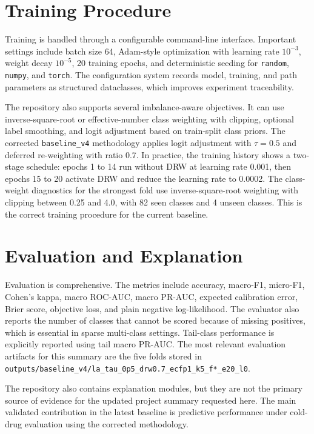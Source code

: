 \documentclass[12pt,a4paper]{report}
\begin{document}
\section*{Training Procedure}
Training is handled through a configurable command-line interface. Important settings include batch size 64, Adam-style optimization with learning rate \(10^{-3}\), weight decay \(10^{-5}\), 20 training epochs, and deterministic seeding for \texttt{random}, \texttt{numpy}, and \texttt{torch}. The configuration system records model, training, and path parameters as structured dataclasses, which improves experiment traceability.

The repository also supports several imbalance-aware objectives. It can use inverse-square-root or effective-number class weighting with clipping, optional label smoothing, and logit adjustment based on train-split class priors. The corrected \texttt{baseline\_v4} methodology applies logit adjustment with \(\tau = 0.5\) and deferred re-weighting with ratio 0.7. In practice, the training history shows a two-stage schedule: epochs 1 to 14 run without DRW at learning rate 0.001, then epochs 15 to 20 activate DRW and reduce the learning rate to 0.0002. The class-weight diagnostics for the strongest fold use inverse-square-root weighting with clipping between 0.25 and 4.0, with 82 seen classes and 4 unseen classes. This is the correct training procedure for the current baseline.

\section*{Evaluation and Explanation}
Evaluation is comprehensive. The metrics include accuracy, macro-F1, micro-F1, Cohen's kappa, macro ROC-AUC, macro PR-AUC, expected calibration error, Brier score, objective loss, and plain negative log-likelihood. The evaluator also reports the number of classes that cannot be scored because of missing positives, which is essential in sparse multi-class settings. Tail-class performance is explicitly reported using tail macro PR-AUC. The most relevant evaluation artifacts for this summary are the five folds stored in \texttt{outputs/baseline\_v4/la\_tau\_0p5\_drw0.7\_ecfp1\_k5\_f*\_e20\_l0}.

The repository also contains explanation modules, but they are not the primary source of evidence for the updated project summary requested here. The main validated contribution in the latest baseline is predictive performance under cold-drug evaluation using the corrected methodology.
\end{document}
